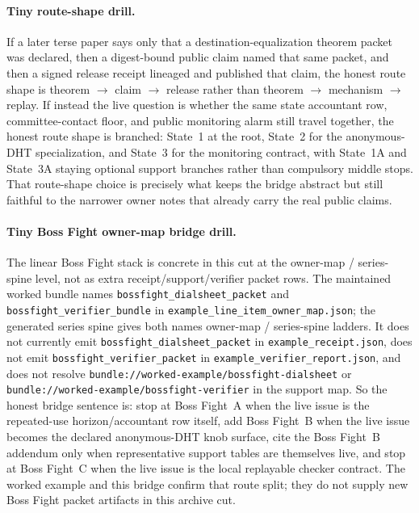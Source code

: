 \documentclass[11pt]{article}
\begin{document}
\paragraph{Tiny route-shape drill.}
If a later terse paper says only that a destination-equalization theorem packet was declared, then a digest-bound public claim named that same packet, and then a signed release receipt lineaged and published that claim, the honest route shape is theorem $\to$ claim $\to$ release rather than theorem $\to$ mechanism $\to$ replay.\cite{series:mceq,series:abomoinl,series:releaseproperty}
If instead the live question is whether the same state accountant row, committee-contact floor, and public monitoring alarm still travel together, the honest route shape is branched: State~1 at the root, State~2 for the anonymous-DHT specialization, and State~3 for the monitoring contract, with State~1A and State~3A staying optional support branches rather than compulsory middle stops.\cite{series:state1,series:state1A,series:mucc,series:state3,series:state3A}
That route-shape choice is precisely what keeps the bridge abstract but still faithful to the narrower owner notes that already carry the real public claims.

\paragraph{Tiny Boss Fight owner-map bridge drill.}
The linear Boss Fight stack is concrete in this cut at the owner-map / series-spine level, not as extra receipt/support/verifier packet rows. The maintained worked bundle names \nolinkurl{bossfight\_dialsheet\_packet} and \nolinkurl{bossfight\_verifier\_bundle} in \nolinkurl{example\_line\_item\_owner\_map.json}; the generated series spine gives both names owner-map / series-spine ladders. It does not currently emit \nolinkurl{bossfight\_dialsheet\_packet} in \nolinkurl{example\_receipt.json}, does not emit \nolinkurl{bossfight\_verifier\_packet} in \nolinkurl{example\_verifier\_report.json}, and does not resolve \nolinkurl{bundle://worked-example/bossfight-dialsheet} or \nolinkurl{bundle://worked-example/bossfight-verifier} in the support map. So the honest bridge sentence is: stop at Boss Fight~A when the live issue is the repeated-use horizon/accountant row itself, add Boss Fight~B when the live issue becomes the declared anonymous-DHT knob surface, cite the Boss Fight~B addendum only when representative support tables are themselves live, and stop at Boss Fight~C when the live issue is the local replayable checker contract. The worked example and this bridge confirm that route split; they do not supply new Boss Fight packet artifacts in this archive cut.\cite{series:bossfightA,series:bossfightB,series:bossfightBaddendum,series:bossfightC,series:workedexample}
\end{document}
